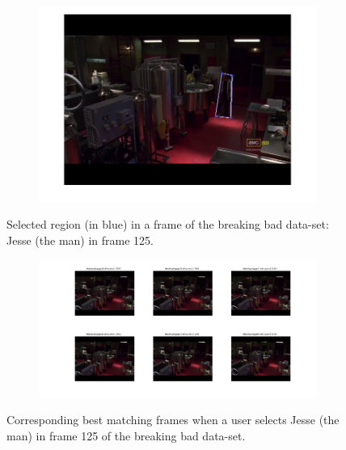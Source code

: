 \documentclass{paper}
\begin{document}
\begin{figure}[!htbp]
\centering
\begin{subfigure}{1.0\textwidth}
\includegraphics[width=\textwidth]{figures/region_queries/bb/selectionRegQ_125}
\end{subfigure}
\caption{Selected region (in blue) in a frame of the breaking bad data-set: Jesse (the man) in frame 125.}
\label{fig:bb_regionquery_sel2}
\end{figure}

\begin{figure}[!htbp]
\centering
\begin{subfigure}{1.0\textwidth}
\includegraphics[width=\textwidth]{figures/region_queries/bb/matchesRegQ_125}
\end{subfigure}
\caption{Corresponding best matching frames when a user selects Jesse (the man) in frame 125 of the breaking bad data-set.}
\label{fig:bb_regionquery_matches2}
\end{figure}
\end{document}
